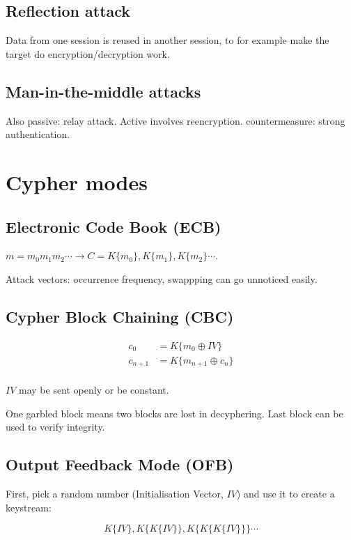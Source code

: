 \documentclass{article}
\begin{document}
\subsection{Reflection attack}

Data from one session is reused in another session, to for example make the
target do encryption/decryption work.

\subsection{Man-in-the-middle attacks}

Also passive: relay attack. Active involves reencryption. countermeasure:
strong authentication.

\section{Cypher modes}

\subsection{Electronic Code Book (ECB)}
$m = m_0m_1m_2\cdots \rightarrow C = K\{m_0\},K\{m_1\},K\{m_2\}\cdots$.

Attack vectors: occurrence frequency, swappping can go unnoticed easily.

\subsection{Cypher Block Chaining (CBC)}

\begin{align*}
  c_0     &= K\{m_0 \oplus IV\} \\
  c_{n+1} &= K\{m_{n+1} \oplus c_n\} \\
\end{align*}

$IV$ may be sent openly or be constant.

One garbled block means two blocks are lost in decyphering. Last block
can be used to verify integrity.

\subsection{Output Feedback Mode (OFB)}

First, pick a random number (Initialisation Vector, $IV$) and use it to
create a keystream:

\[ K\{IV\},K\{K\{IV\}\}, K\{K\{K\{IV\}\}\} \cdots \]
\end{document}
